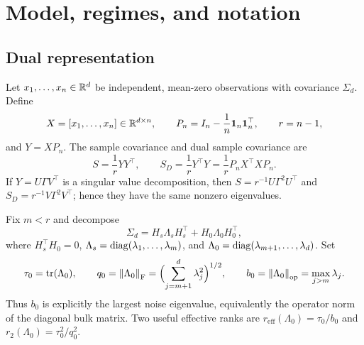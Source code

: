 \section{Model, regimes, and notation}\label{sec:setup}
\subsection{Dual representation}
Let $x_1,\ldots,x_n\in\mathbb{R}^d$ be independent, mean-zero observations with covariance $\Sigma_d$.  Define
\begin{equation}
X=[x_1,\ldots,x_n]\in\mathbb{R}^{d\times n},\qquad P_n=I_n-\frac1n\mathbf{1}_n\mathbf{1}_n^\top,\qquad r=n-1,
\end{equation}
and $Y=XP_n$.  The sample covariance and dual sample covariance are
\begin{equation}
S=\frac1rYY^\top,\qquad S_D=\frac1rY^\top Y=\frac1rP_nX^\top XP_n.
\end{equation}
If $Y=U\Gamma V^\top$ is a singular value decomposition, then $S=r^{-1}U\Gamma^2U^\top$ and $S_D=r^{-1}V\Gamma^2V^\top$; hence they have the same nonzero eigenvalues.

Fix $m<r$ and decompose
\begin{equation}\label{eq:covsplit}
\Sigma_d=H_s\Lambda_sH_s^\top+H_0\Lambda_0H_0^\top,
\end{equation}
where $H_s^\top H_0=0$, $\Lambda_s=\operatorname{diag}(\lambda_1,\ldots,\lambda_m)$, and $\Lambda_0=\operatorname{diag}(\lambda_{m+1},\ldots,\lambda_d)$.  Set
\begin{equation}\label{eq:bulksummaries}
\tau_0=\operatorname{tr}(\Lambda_0),\qquad q_0=\left\lVert\Lambda_0\right\rVert_{\mathrm{F}}=\Bigl(\sum_{j=m+1}^d\lambda_j^2\Bigr)^{1/2},\qquad b_0=\left\lVert\Lambda_0\right\rVert_{\mathrm{op}}=\max_{j>m}\lambda_j.
\end{equation}
Thus $b_0$ is explicitly the largest noise eigenvalue, equivalently the operator norm of the diagonal bulk matrix.  Two useful effective ranks are $r_{\mathrm{eff}}(\Lambda_0)=\tau_0/b_0$ and $r_2(\Lambda_0)=\tau_0^2/q_0^2$.

